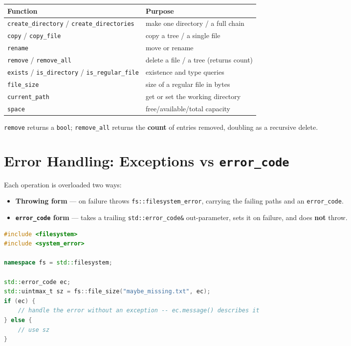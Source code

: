 \begin{center}
\begin{tabular}{ll}
\hline
\textbf{Function} & \textbf{Purpose} \\
\hline
\texttt{create\_directory} / \texttt{create\_directories} & make one directory / a full chain \\
\texttt{copy} / \texttt{copy\_file} & copy a tree / a single file \\
\texttt{rename} & move or rename \\
\texttt{remove} / \texttt{remove\_all} & delete a file / a tree (returns count) \\
\texttt{exists} / \texttt{is\_directory} / \texttt{is\_regular\_file} & existence and type queries \\
\texttt{file\_size} & size of a regular file in bytes \\
\texttt{current\_path} & get or set the working directory \\
\texttt{space} & free/available/total capacity \\
\hline
\end{tabular}
\end{center}

\texttt{remove} returns a \texttt{bool}; \texttt{remove\_all} returns the \textbf{count} of entries removed, doubling as a recursive delete.

\section{Error Handling: Exceptions vs \texttt{error\_code}}
\label{sec:c17-fs-errors}

Each operation is overloaded two ways:

\begin{itemize}
    \item \textbf{Throwing form} --- on failure throws \texttt{fs::filesystem\_error}, carrying the failing paths and an \texttt{error\_code}.
    \item \textbf{\texttt{error\_code} form} --- takes a trailing \texttt{std::error\_code\&} out-parameter, sets it on failure, and does \textbf{not} throw.
\end{itemize}

\begin{lstlisting}[language=C++,caption={The non-throwing overload for expected failures}]
#include <filesystem>
#include <system_error>

namespace fs = std::filesystem;

std::error_code ec;
std::uintmax_t sz = fs::file_size("maybe_missing.txt", ec);
if (ec) {
    // handle the error without an exception -- ec.message() describes it
} else {
    // use sz
}
\end{lstlisting}


